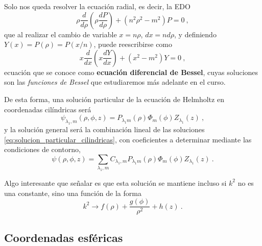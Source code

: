 Solo nos queda resolver la ecuación radial, es decir, la EDO
\begin{equation}
    \rho \frac{d}{d\rho} \left( \rho \frac{dP}{d\rho} \right) + (n^2 \rho^2 - m^2)P = 0 \ ,
\end{equation}
que al realizar el cambio de variable $x = n\rho$, $dx = n d\rho$, y definiendo $Y(x) = P(\rho) = P(x/n)$, puede reescribirse como
\begin{equation}
    x \frac{d}{dx}\left( x \frac{dY}{dx} \right) + (x^2 - m^2)Y = 0 \ ,
\end{equation}
ecuación que se conoce como \textbf{ecuación diferencial de Bessel}, cuyas soluciones son las \emph{funciones de Bessel} que estudiaremos más adelante en el curso.

De esta forma, una solución particular de la ecuación de Helmholtz en coordenadas cilíndricas será
\begin{equation} \label{eq:solucion_particular_cilindricas}
    \psi_{\lambda_1, m}(\rho, \phi, z) = P_{\lambda_1 m}(\rho) \Phi_m(\phi) Z_{\lambda_1}(z) \ ,
\end{equation}
y la solución general será la combinación lineal de las soluciones \eqref{eq:solucion_particular_cilindricas}, con coeficientes a determinar mediante las condiciones de contorno,
\begin{equation}
    \psi(\rho, \phi, z) = \sum_{\lambda_1, m} C_{\lambda_1, m} P_{\lambda_1 m}(\rho) \Phi_m(\phi) Z_{\lambda_1}(z) \ .
\end{equation}

Algo interesante que señalar es que esta solución se mantiene incluso si $k^2$ no es una constante, sino una función de la forma
\begin{equation}
    k^2 \to f(\rho) + \frac{g(\phi)}{\rho^2} + h(z) \ .
\end{equation}

\subsection{Coordenadas esféricas}

